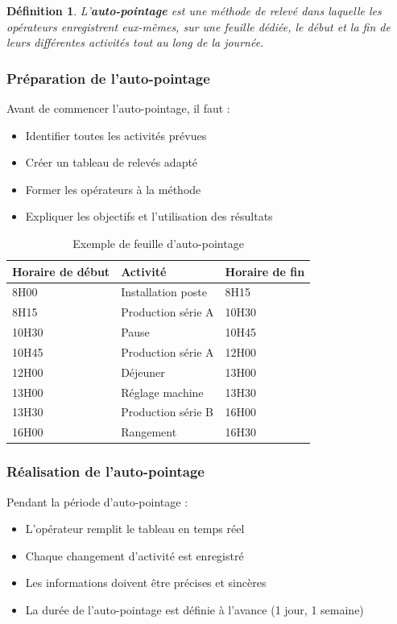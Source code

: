\documentclass[a4paper,12pt]{article}
\newtheorem{definition}{Définition}[section]
\begin{document}
\begin{definition}
L'\textbf{auto-pointage} est une méthode de relevé dans laquelle les opérateurs enregistrent eux-mêmes, sur une feuille dédiée, le début et la fin de leurs différentes activités tout au long de la journée.
\end{definition}

\subsubsection{Préparation de l'auto-pointage}

Avant de commencer l'auto-pointage, il faut :
\begin{itemize}
    \item Identifier toutes les activités prévues
    \item Créer un tableau de relevés adapté
    \item Former les opérateurs à la méthode
    \item Expliquer les objectifs et l'utilisation des résultats
\end{itemize}

\begin{table}[ht]
\centering
\begin{tabular}{|p{4cm}|p{6cm}|p{4cm}|}
\hline
\textbf{Horaire de début} & \textbf{Activité} & \textbf{Horaire de fin} \\
\hline
8H00 & Installation poste & 8H15 \\
8H15 & Production série A & 10H30 \\
10H30 & Pause & 10H45 \\
10H45 & Production série A & 12H00 \\
12H00 & Déjeuner & 13H00 \\
13H00 & Réglage machine & 13H30 \\
13H30 & Production série B & 16H00 \\
16H00 & Rangement & 16H30 \\
\hline
\end{tabular}
\caption{Exemple de feuille d'auto-pointage}
\end{table}

\subsubsection{Réalisation de l'auto-pointage}

Pendant la période d'auto-pointage :
\begin{itemize}
    \item L'opérateur remplit le tableau en temps réel
    \item Chaque changement d'activité est enregistré
    \item Les informations doivent être précises et sincères
    \item La durée de l'auto-pointage est définie à l'avance (1 jour, 1 semaine)
\end{itemize}
\end{document}
